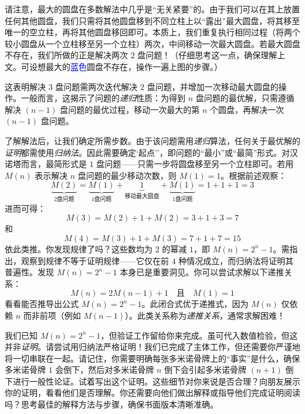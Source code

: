 \begin{center}
\end{center}

请注意，最大的圆盘在多数解法中几乎是``无关紧要''的。由于我们可以在其上放置任何其他圆盘，我们只需将其他圆盘移到不同立柱上以``露出''最大圆盘，将其移至唯一的空立柱，再将其他圆盘移回即可。本质上，我们重复执行相同过程（将两个较小圆盘从一个立柱移至另一个立柱）两次，中间移动一次最大圆盘。若最大圆盘不存在，我们所做的正是解决两次 $2$ 盘问题！（仔细思考这一点，确保理解上文。可设想最大的\textcolor{blue}{蓝色}圆盘不存在，操作一遍上图的步骤。）

这表明解决 $3$ 盘问题需两次迭代解决 $2$ 盘问题，并增加一次移动最大圆盘的操作。一般而言，这揭示了问题的\emph{递归}性质：为得到 $n$ 盘问题的最优解，只需遵循解决 $(n-1)$ 盘问题的最优过程，移动一次最大的第 $n$ 个圆盘，再解决一次 $(n-1)$ 盘问题。

了解解法后，让我们确定所需步数。由于该问题需用\emph{递归}算法，任何关于最优解的\emph{证明}都需使用\emph{归纳法}。因此需要确定`起点''，即问题的``最小''或``最简''形式。对汉诺塔而言，最简形式是 $1$ 盘问题——只需一步将圆盘移至另一个立柱即可。若用 $M(n)$ 表示解决 $n$ 盘问题的最少移动次数，则 $M(1)=1$。根据前述观察：
\[\underbrace{M(2)}_{2 \text{盘问题}}= \underbrace{M(1)}_{1 \text{盘问题}}+ \underbrace{1}_{\text{移动最大圆盘}}+ \underbrace{M(1)}_{1 \text{盘问题}}= 1 + 1 + 1 = 3\]
进而可得：
\[M(3) = M(2) + 1 + M(2) = 3 + 1 + 3 = 7\]
和
\[M(4) = M(3) + 1 + M(3) = 7 + 1 + 7 = 15\]
依此类推。你发现规律了吗？这些数均为 $2$ 的幂减 $1$，即 $M(n)=2^n-1$。需指出，观察到规律不等于证明规律——它仅在前 $4$ 种情况成立，而归纳法将证明其普遍性。发现 $M(n)=2^n-1$ 本身已是重要洞见。你可以尝试求解以下递推关系：
\[M(n) = 2M(n - 1) + 1 \quad \text{且} \quad M(1) = 1\]
看看能否推导出公式 $M(n) = 2^n -1$。此闭合式优于递推式，因为 $M(n)$ 仅依赖 $n$ 而非前项（例如 $M(n-1)$）。此类关系称为\emph{递推关系}，通常求解困难！

我们已知 $M(n)=2^n-1$，但验证工作留给你来完成。虽可代入数值检验，但这并非\emph{证明}。请尝试用归纳法严格证明！我们已完成了主体工作，但还需要你严谨地将一切串联在一起。请记住，你需要明确每张多米诺骨牌上的``事实''是什么，确保多米诺骨牌 $1$ 会倒下，然后对多米诺骨牌 $n$ 倒下会引起多米诺骨牌 $(n+1)$ 倒下进行一般性论证。试着写出这个证明。这些细节对你来说是否合理？向朋友展示你的证明，看看他们是否理解。你还需要向他们做出解释或指导他们完成证明阅读吗？思考最佳的解释方法与步骤，确保书面版本清晰准确。

\clearpage
